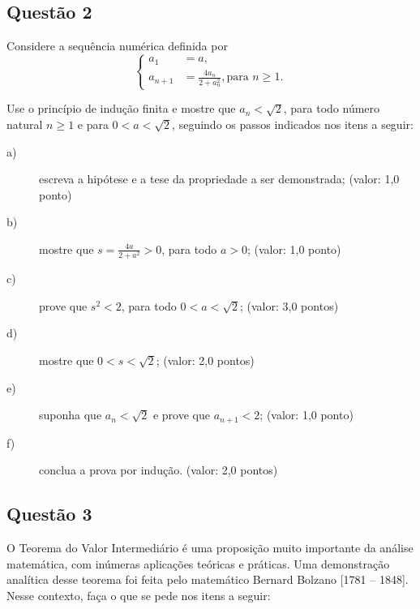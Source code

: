 \documentclass[12pt]{article}
\begin{document}
\subsection*{\color{blue} Questão 2}

Considere a sequência numérica definida por $$\begin{cases}
a_1 & = a,\\
a_{n+1} & = \frac{4a_n}{2+a_n^2}, \text{para } n\geq 1.
\end{cases}$$ 

Use o princípio de indução finita e mostre que $a_n<\sqrt{2}$, para todo número natural $n\geq 1$ e para $0<a<\sqrt{2}$, seguindo os passos indicados nos itens a seguir:

\begin{description}

\item[a)] escreva a hipótese e a tese da propriedade a ser demonstrada; (valor: 1,0 ponto)

\item[b)] mostre que $\displaystyle{s = \frac{4a}{2+a^2}>0}$, para todo $a>0$; (valor: 1,0 ponto)

\item[c)] prove que $s^2<2$, para todo $0<a<\sqrt{2}$; (valor: 3,0 pontos)

\item[d)] mostre que $0<s<\sqrt{2}$; (valor: 2,0 pontos)

\item[e)] suponha que $a_n<\sqrt{2}$ e prove que $a_{n+1}<2$; (valor: 1,0 ponto)

\item[f)] conclua a prova por indução. (valor: 2,0 pontos)

\end{description}

\subsection*{\color{blue} Questão 3}

O Teorema do Valor Intermediário é uma proposição muito importante da análise matemática, com inúmeras aplicações teóricas e práticas. Uma demonstração analítica desse teorema foi feita pelo matemático Bernard Bolzano [1781 – 1848]. Nesse contexto, faça o que se pede nos itens a seguir:
\end{document}
